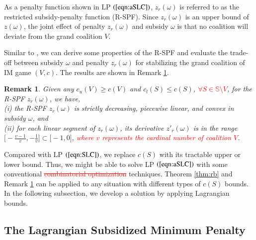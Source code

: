 \documentclass[authoryear,review,12pt]{elsarticle}
\newtheorem{remark}{Remark}
\begin{document}
As a penalty function shown in LP $(\ref{eqn:aSLC})$, $z_r(\omega)$ is referred to as the restricted subsidy-penalty function (R-SPF).
Since $z_r(\omega)$ is an upper bound of $z(\omega)$, the joint effect of penalty $z_r(\omega)$ and subsidy $\omega$ is that no coalition will deviate from the grand coalition $V$.


Similar to \cite{leastcore2018}, we can derive some properties of the R-SPF and evaluate the trade-off between subsidy $\omega$ and penalty $z_r(\omega)$ for stabilizing the grand coalition of IM game $(V,c)$.
The results are shown in Remark \ref{rem:convex}.

\begin{remark}\label{rem:convex}
Given any $c_u(V) \geq c(V)$ and $c_l(S) \leq c(S)$, \textcolor{red}{$\forall S \in \mathbb{S} \setminus V$}, for the R-SPF $z_r(\omega)$, we have,\\
(i) the R-SPF $z_r(\omega)$ is strictly decreasing, piecewise linear, and convex in subsidy $\omega$, and\\
(ii) for each linear segment of $z_r(\omega)$, its derivative $z'_r(\omega)$ is in the range $\big[ -\frac{v-1}{v}, -\frac{1}{v} \big] \subset \big[-1,0\big]$, \textcolor{red}{where $v$ represents the cardinal number of coalition $V$}.
\end{remark}


Compared with LP $(\ref{eqn:SLC})$, we replace $c(S)$ with its tractable upper or lower bound. Thus, we might be able to solve LP $(\ref{eqn:aSLC})$ with some conventional
\textcolor{red}{\st{combinatorial optimization}}
techniques.
Theorem \ref{thm:rb} and Remark \ref{rem:convex} can be applied to any situation with different types of $c(S)$ bounds.
In the following subsection, we develop a solution by applying Lagrangian bounds.


\subsection{The Lagrangian Subsidized Minimum Penalty}\label{section:CGBAM}
\end{document}
